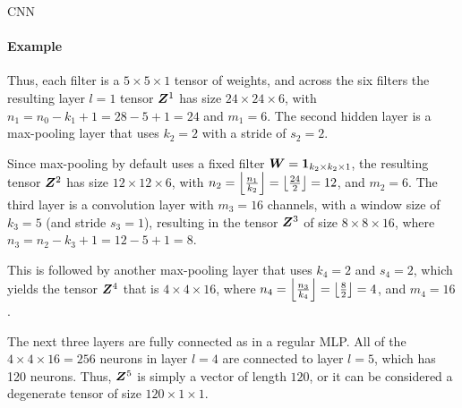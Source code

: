 \begin{frame}{CNN}
\framesubtitle{Example}

    Thus, each filter
    is a $5 \times 5 \times 1$ tensor of weights, and across the six
    filters the resulting
    layer $l=1$ tensor ${\boldsymbol Z}^1$ has size $24 \times 24 \times 6$, with $n_1 = n_0
    - k_1 +1 = 28-5+1 = 24$ and $m_1 = 6$.
    The second hidden layer is a max-pooling layer that uses $k_2=2$ with
    a stride of $s_2=2$. 


\medskip

    Since max-pooling by default uses a fixed filter ${\boldsymbol W} =
    \mathbf{1}_{k_2 \times k_2 \times 1}$, the resulting
    tensor ${\boldsymbol Z}^2$ has size $12 \times 12 \times 6$, with $n_2 =
    \left\lfloor \tfrac{n_1}{k_2} \right\rfloor = 
    \left\lfloor\tfrac{24}{2}\right\rfloor = 12$, and $m_2 = 6$.
    The third
    layer is a convolution layer with $m_3 =16$ channels, with a
    window size of $k_3=5$ (and stride $s_3=1$), 
    resulting in the
    tensor ${\boldsymbol Z}^3$ of size $8 \times 8 \times 16$, where $n_3 = n_2 -
    k_3 + 1 = 12-5+1 = 8$.


\medskip

    This is followed
    by another max-pooling layer that uses $k_4=2$ and $s_4=2$, which
    yields the tensor ${\boldsymbol Z}^4$ that is $4 \times 4 \times 16$, where 
    $n_4 = \left\lfloor \tfrac{n_3}{k_4} \right\rfloor = 
    \left\lfloor\tfrac{8}{2}\right\rfloor = 4$, and $m_4 = 16$.



\medskip

    The next three layers are fully connected as in a regular MLP. All
    of the $4\times 4\times 16 = 256$ neurons in layer $l=4$ are
    connected to layer $l=5$, which has 120 neurons. Thus, ${\boldsymbol Z}^5$ is
    simply a vector of length $120$, or it can be considered a
    degenerate tensor of size $120 \times 1 \times 1$. 
\end{frame}

